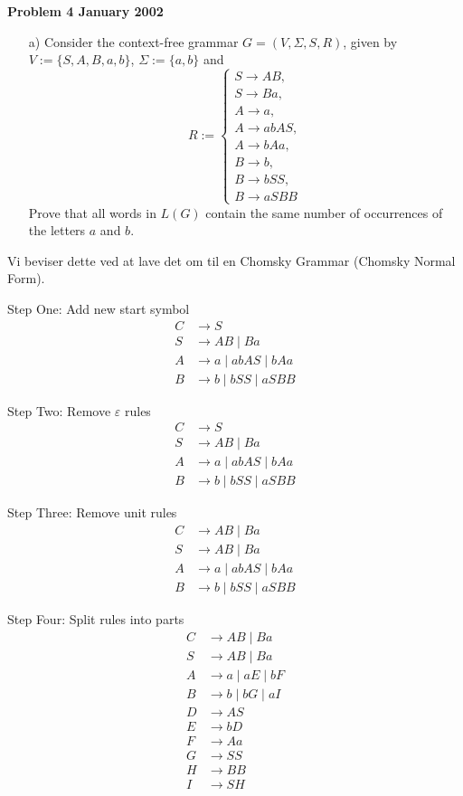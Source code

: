 \noindent
{\Large \textbf{Problem 4 January 2002}}\\
\noindent
\begin{enumerate}
    \item[a)] Consider the context-free grammar \( G = (V, \Sigma, S, R) \), given by
    \( V := \{S, A, B, a, b\} \), \( \Sigma := \{a, b\} \) and
    \[
    R := \left\{
    \begin{array}{l}
    S \to AB, \\
    S \to Ba, \\
    A \to a, \\
    A \to abAS, \\
    A \to bAa, \\
    B \to b, \\
    B \to bSS, \\
    B \to aSBB
    \end{array}
    \right.
    \]
    Prove that all words in \( L(G) \) contain the same number of occurrences of the letters \( a \) and \( b \).
\end{enumerate}

Vi beviser dette ved at lave det om til en Chomsky Grammar (Chomsky Normal Form).

Step One: Add new start symbol
\begin{align*}
C &\to S \\
S &\to AB \mid Ba \\
A &\to a \mid abAS \mid bAa \\
B &\to b \mid bSS \mid aSBB
\end{align*}

Step Two: Remove \(\varepsilon\) rules
\begin{align*}
C &\to S \\
S &\to AB \mid Ba \\
A &\to a \mid abAS \mid bAa \\
B &\to b \mid bSS \mid aSBB
\end{align*}

Step Three: Remove unit rules
\begin{align*}
C &\to AB \mid Ba \\
S &\to AB \mid Ba \\
A &\to a \mid abAS \mid bAa \\
B &\to b \mid bSS \mid aSBB
\end{align*}

Step Four: Split rules into parts
\begin{align*}
C &\to AB \mid Ba \\
S &\to AB \mid Ba \\
A &\to a \mid aE \mid bF \\
B &\to b \mid bG \mid aI \\
D &\to AS \\
E &\to bD \\
F &\to Aa \\
G &\to SS \\
H &\to BB \\
I &\to SH
\end{align*}

